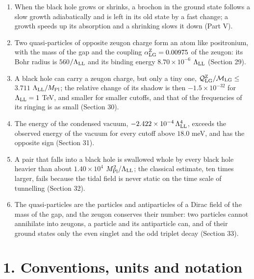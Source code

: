 \documentclass[
  10pt,
]{article}
\begin{document}
\begin{enumerate}
  \(y_{\rm LG}=G_{\rm N}M_{\rm LG}m_{\rm LL}/(\hbar c)\), which decay by
  falling into the black hole at rates that fall as \(y_{\rm LG}^5\) and
  faster. The wave that falls in crosses the horizon smoothly and
  reaches the centre (Part IV).
\item
  When the black hole grows or shrinks, a brochon in the ground state
  follows a slow growth adiabatically and is left in its old state by a
  fast change; a growth speeds up its absorption and a shrinking slows
  it down (Part V).
\item
  Two quasi-particles of opposite zeugon charge form an atom like
  positronium, with the mass of the gap and the coupling
  \(\alpha^{\rm Z}_{\rm LG}=0.00975\) of the zeugon: its Bohr radius is
  \(560\)\(/\Lambda_{\rm LL}\) and its binding energy
  \(8.70\times10^{-6}\) \(\Lambda_{\rm LL}\) (Section 29).
\item
  A black hole can carry a zeugon charge, but only a tiny one,
  \(\mathcal Q^{\rm Z}_{\rm LG}/\mathcal M_{\rm LG}\le\) \(3.711\)
  \(\Lambda_{\rm LL}/M_{\rm Pl}\); the relative change of its shadow is
  then \(-1.5\times10^{-32}\) for \(\Lambda_{\rm LL}=1\) TeV, and
  smaller for smaller cutoffs, and that of the frequencies of its
  ringing is as small (Section 30).
\item
  The energy of the condensed vacuum,
  \(-2.422\times10^{-4}\,\Lambda_{\rm LL}^4\), exceeds the observed
  energy of the vacuum for every cutoff above \(18.0\) meV, and has the
  opposite sign (Section 31).
\item
  A pair that falls into a black hole is swallowed whole by every black
  hole heavier than about \(1.40\times10^{4}\)
  \(M_{\rm Pl}^2/\Lambda_{\rm LL}\); the classical estimate, ten times
  larger, fails because the tidal field is never static on the time
  scale of tunnelling (Section 32).
\item
  The quasi-particles are the particles and antiparticles of a Dirac
  field of the mass of the gap, and the zeugon conserves their number:
  two particles cannot annihilate into zeugons, a particle and its
  antiparticle can, and of their ground states only the even singlet and
  the odd triplet decay (Section 33).
\end{enumerate}

\hypertarget{conventions-units-and-notation}{%
\section{1. Conventions, units and
notation}\label{conventions-units-and-notation}}
\end{document}
